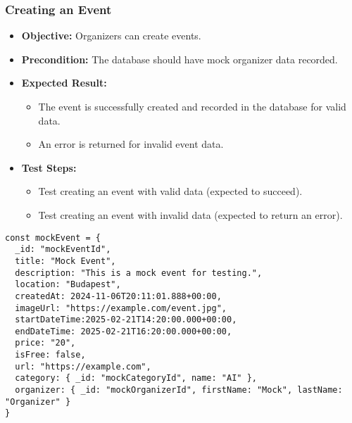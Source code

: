 \subsubsection{Creating an Event}
\begin{itemize}
    \item \textbf{Objective:} Organizers can create events.
    \item \textbf{Precondition:} The database should have mock organizer data recorded.
    \item \textbf{Expected Result:}
    \begin{itemize}
        \item The event is successfully created and recorded in the database for valid data.
        \item An error is returned for invalid event data.
    \end{itemize}
    \item \textbf{Test Steps:}
    \begin{itemize}
        \item Test creating an event with valid data (expected to succeed).
        \item Test creating an event with invalid data (expected to return an error).
    \end{itemize}
\end{itemize}

\begin{lstlisting}[style=typescript, caption={Mock Test Data - Event}]
const mockEvent = {
  _id: "mockEventId",
  title: "Mock Event",
  description: "This is a mock event for testing.",
  location: "Budapest",
  createdAt: 2024-11-06T20:11:01.888+00:00,
  imageUrl: "https://example.com/event.jpg",
  startDateTime:2025-02-21T14:20:00.000+00:00,
  endDateTime: 2025-02-21T16:20:00.000+00:00,
  price: "20",
  isFree: false,
  url: "https://example.com",
  category: { _id: "mockCategoryId", name: "AI" },
  organizer: { _id: "mockOrganizerId", firstName: "Mock", lastName: "Organizer" }
}
\end{lstlisting}  

